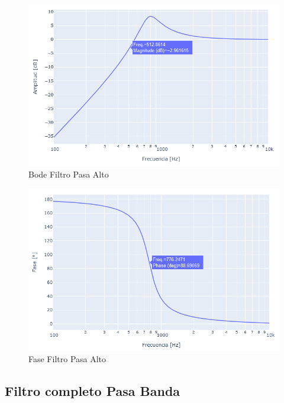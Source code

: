 \begin{figure}[H]
    \centering
    \includegraphics[width=1\linewidth]{figuras/diagramas/pasa_alto_amp.png}
    \caption{Bode Filtro Pasa Alto}
\end{figure}
\begin{figure}[H]
    \centering
    \includegraphics[width=1\linewidth]{figuras/diagramas/pasa_alto_fase.png}
    \caption{Fase Filtro Pasa Alto}
\end{figure}
\newpage

\subsection{Filtro completo Pasa Banda}

